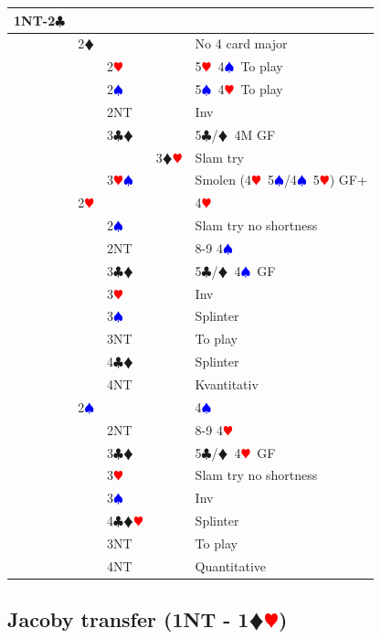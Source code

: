 \documentclass[a4paper]{article}
\newcommand{\BC}{\textcolor{OliveGreen}{$\clubsuit$}}
\newcommand{\BD}{\textcolor{RedOrange}{$\vardiamondsuit$}}
\newcommand{\BH}{\textcolor{Red}{$\varheartsuit${}}}
\newcommand{\BS}{\textcolor{Blue}{$\spadesuit${}}}
\newcommand{\pdfd}{\texorpdfstring{\BD{}}{D}}
\newcommand{\pdfh}{\texorpdfstring{\BH{}}{H}}
\begin{document}
\begingroup
\renewcommand{\arraystretch}{1.4}
\begin{xltabular}{\linewidth}{|l|l|l|l|X|}
\hline
1NT-2\BC &  &  &  &  \\
\hline
 & 2\BD &  &  & No 4 card major \\
\hline
 &  & 2\BH &  & 5\BH\ 4\BS\ To play \\
\hline
 &  & 2\BS &  & 5\BS\ 4\BH\ To play \\
\hline
 &  & 2NT &  & Inv \\
\hline
 &  & 3\BC\BD &  & 5\BC /\BD\ 4M GF \\
\hline
 &  &  & 3\BD\BH & Slam try \\
\hline
 &  & 3\BH\BS &  & Smolen (4\BH\ 5\BS /4\BS\ 5\BH ) GF+ \\
\hline
 & 2\BH &  &  & 4\BH \\
\hline
 &  & 2\BS &  & Slam try no shortness \\
\hline
 &  & 2NT &  & 8-9 4\BS \\
\hline
 &  & 3\BC\BD &  & 5\BC /\BD\ 4\BS\ GF \\
\hline
 &  & 3\BH &  & Inv \\
\hline
 &  & 3\BS &  & Splinter \\
\hline
 &  & 3NT &  & To play \\
\hline
 &  & 4\BC\BD &  & Splinter \\
\hline
 &  & 4NT &  & Kvantitativ \\
\hline
 & 2\BS &  &  & 4\BS \\
\hline
 &  & 2NT &  & 8-9 4\BH \\
\hline
 &  & 3\BC\BD &  & 5\BC /\BD\ 4\BH\ GF \\
\hline
 &  & 3\BH &  & Slam try no shortness \\
\hline
 &  & 3\BS &  & Inv \\
\hline
 &  & 4\BC\BD\BH &  & Splinter \\
\hline
 &  & 3NT &  & To play \\
\hline
 &  & 4NT &  & Quantitative \\
\hline
\end{xltabular}
\endgroup
\bigbreak
\subsection{Jacoby transfer (1NT - 1\pdfd\pdfh)}
\end{document}
